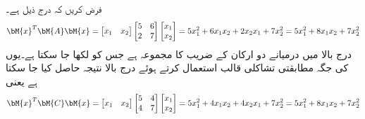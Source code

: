 فرض کریں کہ درج ذیل ہے۔
\begin{align*}
\bM{x}^T\bM{A}\bM{x}=\begin{bmatrix} x_1& x_2 \end{bmatrix}\begin{bmatrix} 5& 6\\2& 7\end{bmatrix}\begin{bmatrix}x_1\\x_2  \end{bmatrix}=5x_1^2+6x_1x_2+2x_2x_1+7x_2^2=5x_1^2+8x_1x_2+7x_2^2
\end{align*} 
درج بالا میں درمیانے دو ارکان کے  ضریب  کا مجموعہ  ہے جس کو  لکھا جا سکتا ہے۔یوں  کی جگہ مطابقتی تشاکلی قالب  استعمال کرتے ہوئے درج بالا نتیجہ حاصل کیا جا سکتا ہے یعنی
\begin{align*}
\bM{x}^T\bM{C}\bM{x}=\begin{bmatrix} x_1& x_2 \end{bmatrix}\begin{bmatrix} 5& 4\\4& 7\end{bmatrix}\begin{bmatrix}x_1\\x_2  \end{bmatrix}=5x_1^2+4x_1x_2+4x_2x_1+7x_2^2=5x_1^2+8x_1x_2+7x_2^2
\end{align*} 

